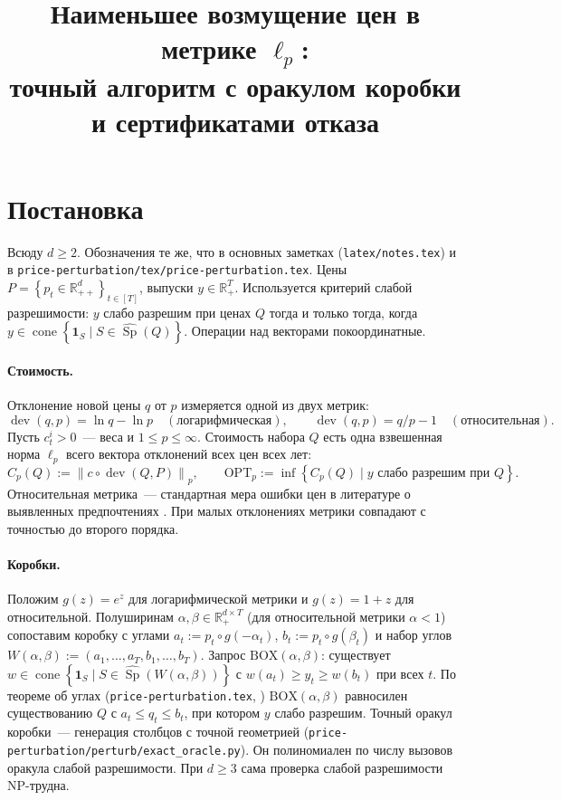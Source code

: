 \documentclass[a4paper,11pt]{article}
\title{Наименьшее возмущение цен в метрике $\ell_p$:\\ точный алгоритм с оракулом коробки и сертификатами отказа}
\date{}
\newcommand{\lean}[1]{\mbox{\path{#1}}}
\theoremstyle{plain}
\theoremstyle{definition}
\theoremstyle{remark}
\newcommand{\R}{\mathbb{R}}
\newcommand{\norm}[1]{\left\lVert #1 \right\rVert}
\newcommand{\set}[1]{\left\{ #1 \right\}}
\newcommand{\Rpp}[1][2]{\R^{#1}_{++}}
\newcommand{\Rp}[1][2]{\R^{#1}_{+}}
\DeclareMathOperator{\cone}{cone}
\DeclareMathOperator{\Sp}{Sp}
\DeclareMathOperator{\dev}{dev}
\newcommand{\OPT}{\mathrm{OPT}}
\newcommand{\BOX}{\mathrm{BOX}}
\begin{document}
\maketitle

\section{Постановка}

Всюду $d\ge2$. Обозначения те же, что в основных заметках (\texttt{latex/notes.tex}) и в \texttt{price-perturbation/tex/price-perturbation.tex}. Цены $P=\set{p_t\in\Rpp[d]}_{t\in[T]}$, выпуски $y\in\Rp[T]$. Используется критерий слабой разрешимости: $y$ слабо разрешим при ценах $Q$ тогда и только тогда, когда $y\in\cone\set{\mathbf 1_S\mid S\in\widehat{\Sp}(Q)}$. Операции над векторами покоординатные.

\paragraph{Стоимость.} Отклонение новой цены $q$ от $p$ измеряется одной из двух метрик:
\[
    \dev(q,p)=\ln q-\ln p\quad(\text{логарифмическая}),\qquad \dev(q,p)=q/p-1\quad(\text{относительная}).
\]
Пусть $c^i_t>0$~--- веса и $1\le p\le\infty$. Стоимость набора $Q$ есть одна взвешенная норма $\ell_p$ всего вектора отклонений всех цен всех лет:
\[
    C_p(Q):=\norm{c\circ\dev(Q,P)}_p,\qquad \OPT_p:=\inf\set{C_p(Q)\mid y\text{ слабо разрешим при }Q}.
\]
Относительная метрика~--- стандартная мера ошибки цен в литературе о выявленных предпочтениях \cite{Varian1985,DemuynckRehbeck2023}. При малых отклонениях метрики совпадают с точностью до второго порядка.

\paragraph{Коробки.} Положим $g(z)=e^z$ для логарифмической метрики и $g(z)=1+z$ для относительной. Полуширинам $\alpha,\beta\in\Rp[d\times T]$ (для относительной метрики $\alpha<1$) сопоставим коробку с углами $a_t:=p_t\circ g(-\alpha_t)$, $b_t:=p_t\circ g(\beta_t)$ и набор углов $W(\alpha,\beta):=(a_1,\dots,a_T,b_1,\dots,b_T)$. Запрос $\BOX(\alpha,\beta)$: существует $w\in\cone\set{\mathbf 1_S\mid S\in\widehat{\Sp}(W(\alpha,\beta))}$ с $w(a_t)\ge y_t\ge w(b_t)$ при всех $t$. По теореме об углах (\texttt{price-perturbation.tex}, \lean{box_iff}) $\BOX(\alpha,\beta)$ равносилен существованию $Q$ с $a_t\le q_t\le b_t$, при котором $y$ слабо разрешим. Точный оракул коробки~--- генерация столбцов с точной геометрией (\texttt{price-perturbation/perturb/exact\_oracle.py}). Он полиномиален по числу вызовов оракула слабой разрешимости. При $d\ge3$ сама проверка слабой разрешимости NP-трудна.
\end{document}
